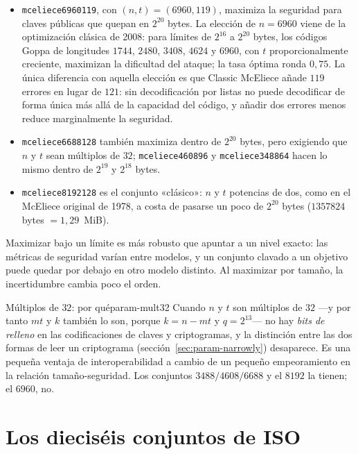 \documentclass[11pt,a4paper,oneside]{report}
\begin{document}
\begin{itemize}[leftmargin=1.5em,itemsep=3pt]
  \item \texttt{mceliece6960119}, con $(n,t)=(6960,119)$, maximiza la
        seguridad para claves públicas que quepan en $2^{20}$ bytes.
        La elección de $n=6960$ viene de la optimización clásica de
        2008: para límites de $2^{16}$ a $2^{20}$ bytes, los códigos
        Goppa de longitudes $1744$, $2480$, $3408$, $4624$ y $6960$,
        con $t$ proporcionalmente creciente, maximizan la dificultad
        del ataque; la tasa óptima ronda $0{,}75$. La única diferencia
        con aquella elección es que Classic McEliece añade $119$
        errores en lugar de $121$: sin decodificación por listas no
        puede decodificar de forma única más allá de la capacidad del
        código, y añadir dos errores menos reduce marginalmente la
        seguridad.
  \item \texttt{mceliece6688128} también maximiza dentro de $2^{20}$
        bytes, pero exigiendo que $n$ y $t$ sean múltiplos de $32$;
        \texttt{mceliece460896} y \texttt{mceliece348864} hacen lo
        mismo dentro de $2^{19}$ y $2^{18}$ bytes.
  \item \texttt{mceliece8192128} es el conjunto «clásico»: $n$ y $t$
        potencias de dos, como en el McEliece original de 1978, a
        costa de pasarse un poco de $2^{20}$ bytes
        ($\num{1357824}$ bytes $=1{,}29$~MiB).
\end{itemize}

Maximizar bajo un límite es más robusto que apuntar a un nivel exacto:
las métricas de seguridad varían entre modelos, y un conjunto clavado
a un objetivo puede quedar por debajo en otro modelo distinto. Al
maximizar por tamaño, la incertidumbre cambia poco el orden.

\begin{observacion}{Múltiplos de $32$: por qué}{param-mult32}
Cuando $n$ y $t$ son múltiplos de $32$ ---y por tanto $mt$ y $k$
también lo son, porque $k=n-mt$ y $q=2^{13}$--- no hay \emph{bits de
relleno} en las codificaciones de claves y criptogramas, y la
distinción entre las dos formas de leer un criptograma
(sección~\ref{sec:param-narrowly}) desaparece. Es una pequeña ventaja
de interoperabilidad a cambio de un pequeño empeoramiento en la
relación tamaño-seguridad. Los conjuntos $3488/4608/6688$ y el
$8192$ la tienen; el $6960$, no.
\end{observacion}

\section{Los dieciséis conjuntos de ISO}\label{sec:param-iso}
\end{document}
